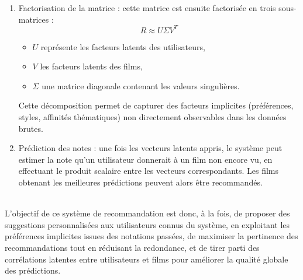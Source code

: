 \documentclass{article}
\begin{document}
\begin{itemize}
\begin{enumerate}
              \item Factorisation de la matrice : cette matrice est ensuite factorisée en trois sous-matrices :\\
                    \[ R \approx U \Sigma V^T \]
                    \begin{itemize}
                        \item \(U\) représente les facteurs latents des utilisateurs,
                        \item \(V\) les facteurs latents des films,
                        \item \(\Sigma\) une matrice diagonale contenant les valeurs singulières.
                    \end{itemize}
                    Cette décomposition permet de capturer des facteurs implicites (préférences, styles, affinités thématiques) non directement observables dans les données brutes.
              \item Prédiction des notes : une fois les vecteurs latents appris, le système peut estimer la note qu’un utilisateur donnerait à un film non encore vu, en effectuant le produit scalaire entre les vecteurs correspondants.
                    Les films obtenant les meilleures prédictions peuvent alors être recommandés.
          \end{enumerate}
          $ $\\
          L’objectif de ce système de recommandation est donc, à la fois, de proposer des suggestions personnalisées aux utilisateurs connus du système,
          en exploitant les préférences implicites issues des notations passées, de maximiser la pertinence des recommandations tout en réduisant la redondance,
          et de tirer parti des corrélations latentes entre utilisateurs et films pour améliorer la qualité globale des prédictions.
          $ $\\


\end{itemize}
\end{document}
